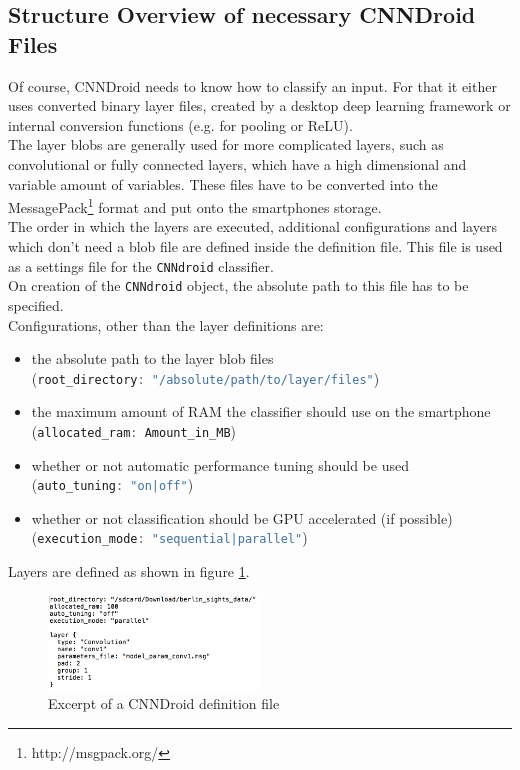 \subsection{Structure Overview of necessary CNNDroid Files}
Of course, CNNDroid needs to know how to classify an input. For that it either uses converted binary layer files, created by a desktop deep learning framework or internal conversion functions (e.g. for pooling or ReLU).\\
The layer blobs are generally used for more complicated layers, such as convolutional or fully connected layers, which have a high dimensional and variable amount of variables. These files have to be converted into the MessagePack\footnote{http://msgpack.org/} format and put onto the smartphones storage.\\
The order in which the layers are executed, additional configurations and layers which don't need a blob file are defined inside the definition file. This file is used as a settings file for the \lstinline[language=Java]{CNNdroid} classifier.\\
On creation of the \lstinline[language=Java]{CNNdroid} object, the absolute path to this file has to be specified.\\
Configurations, other than the layer definitions are:
\begin{itemize}
    \item{the absolute path to the layer blob files\\(\lstinline[language=Java]{root_directory: "/absolute/path/to/layer/files"})}
    \item{the maximum amount of RAM the classifier should use on the smartphone\\(\lstinline[language=Java]{allocated_ram: Amount_in_MB})}
    \item{whether or not automatic performance tuning should be used\\(\lstinline[language=Java]{auto_tuning: "on|off"})}
    \item{whether or not classification should be GPU accelerated (if possible)\\(\lstinline[language=Java]{execution_mode: "sequential|parallel"})}
\end{itemize}
Layers are defined as shown in figure \ref{fig:def_file}.

\begin{figure}[H]
  \centering
    \includegraphics[width=0.5\textwidth]{def_file.png}
  \caption{Excerpt of a CNNDroid definition file}
  \label{fig:def_file}
\end{figure}

